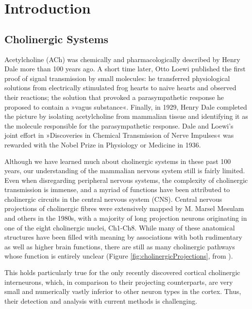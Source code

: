 \chapter{Introduction}
\label{introduction}
\section{Cholinergic Systems}
 Acetylcholine (ACh) was chemically and pharmacologically described by Henry Dale more than 100 years ago\cite{Dale1914}. A short time later, Otto Loewi published the first proof of signal transmission by small molecules: he transferred physiological solutions from electrically stimulated frog hearts to naive hearts and observed their reactions; the solution that provoked a parasympathetic response he proposed to contain a »vagus substance«\cite{Loewi1921}. Finally, in 1929, Henry Dale completed the picture by isolating acetylcholine from mammalian tissue and identifying it as the molecule responsible for the parasympathetic response\cite{Dale1929}. Dale and Loewi's joint effort in »Discoveries in Chemical Transmission of Nerve Impulses« was rewarded with the Nobel Prize in Physiology or Medicine in 1936.

Although we have learned much about cholinergic systems in these past 100 years, our understanding of the mammalian nervous system still is fairly limited. Even when disregarding peripheral nervous systems, the complexity of cholinergic transmission is immense, and a myriad of functions have been attributed to cholinergic circuits in the central nervous system (CNS). Central nervous projections of cholinergic fibres were extensively mapped by M. Marsel Mesulam and others in the 1980s\cite{Mesulam1984}, with a majority of long projection neurons originating in one of the eight cholinergic nuclei, Ch1-Ch8. While many of these anatomical structures have been filled with meaning by associations with both rudimentary as well as higher brain functions, there are still as many cholinergic pathways whose function is entirely unclear (Figure \ref{fig:cholinergicProjections}, from \cite{Lobentanzer2019}).

This holds particularly true for the only recently discovered cortical cholinergic interneurons, which, in comparison to their projecting counterparts, are very small and numerically vastly inferior to other neuron types in the cortex. Thus, their detection and analysis with current methods is challenging. 

